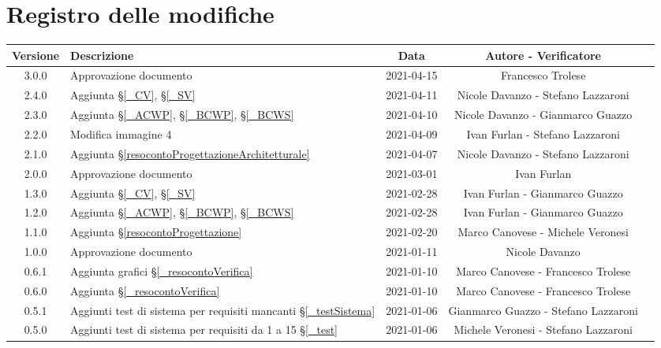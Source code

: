 \section*{Registro delle modifiche}

\begin{center}
	\begin{longtable}{|c|p{5cm}|c|c|c|}
	\hline
	\rowcolor{lighter-grayer}
	\textbf{Versione} & \textbf{Descrizione} & \textbf{Data} & \textbf{Autore - Verificatore} \\
	\hline
	\endfirsthead


	\hline
	3.0.0 & Approvazione documento & 2021-04-15 & Francesco Trolese \\
	2.4.0 & Aggiunta \S\ref{_CV}, \S\ref{_SV} & 2021-04-11 & Nicole Davanzo - Stefano Lazzaroni \\
	2.3.0 & Aggiunta \S\ref{_ACWP}, \S\ref{_BCWP}, \S\ref{_BCWS} & 2021-04-10 & Nicole Davanzo - Gianmarco Guazzo \\
	2.2.0 & Modifica immagine 4  & 2021-04-09 & Ivan Furlan - Stefano Lazzaroni \\
	2.1.0 & Aggiunta \S\ref{resocontoProgettazioneArchitetturale} & 2021-04-07 & Nicole Davanzo - Stefano Lazzaroni \\
	2.0.0 & Approvazione documento & 2021-03-01 & Ivan Furlan \\
	1.3.0 & Aggiunta \S\ref{_CV}, \S\ref{_SV} & 2021-02-28 & Ivan Furlan - Gianmarco Guazzo \\
	1.2.0 & Aggiunta \S\ref{_ACWP}, \S\ref{_BCWP}, \S\ref{_BCWS} & 2021-02-28 & Ivan Furlan - Gianmarco Guazzo \\
	1.1.0 & Aggiunta \S\ref{resocontoProgettazione} & 2021-02-20 & Marco Canovese - Michele Veronesi \\
	1.0.0 & Approvazione documento & 2021-01-11 & Nicole Davanzo \\
	0.6.1 & Aggiunta grafici \S\ref{_resocontoVerifica} & 2021-01-10 & Marco Canovese - Francesco Trolese \\
	0.6.0 & Aggiunta \S\ref{_resocontoVerifica} & 2021-01-10 & Marco Canovese - Francesco Trolese \\
	0.5.1 & Aggiunti test di sistema per requisiti mancanti \S\ref{_testSistema}& 2021-01-06 & Gianmarco Guazzo - Stefano Lazzaroni \\
	0.5.0 & Aggiunti test di sistema per requisiti da 1 a 15 \S\ref{_test}& 2021-01-06 & Michele Veronesi - Stefano Lazzaroni \\

\end{longtable}
\end{center}
